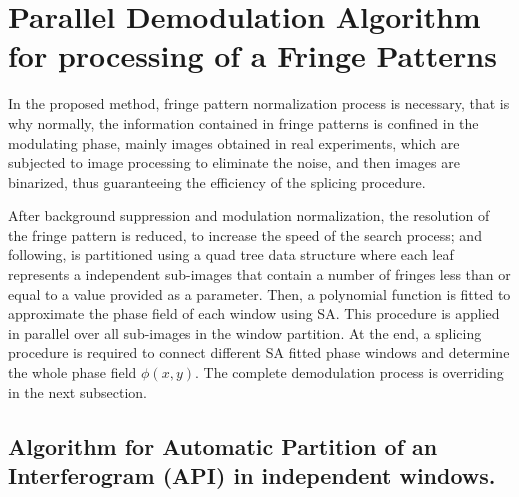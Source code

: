 \documentclass[review]{elsarticle}
\begin{document}
\section{Parallel Demodulation Algorithm for processing of a Fringe Patterns}

In the proposed method, fringe pattern normalization process is necessary, that is why normally, the information contained in fringe patterns is confined in the modulating phase, mainly images obtained in real experiments, which are subjected to image processing to eliminate the noise, and then images are binarized, thus guaranteeing the efficiency of the splicing procedure.

After background suppression and modulation normalization, the resolution of the fringe pattern is reduced, to increase the speed of the search process; and following, is partitioned using a quad tree data structure where each leaf represents a independent sub-images that contain a number of fringes less than or equal to a value provided as a parameter. Then, a polynomial function is fitted to approximate the phase field of each window using SA. This procedure is applied in parallel over all sub-images in the window partition. At the end, a splicing procedure is required to connect different SA fitted phase windows and determine the whole phase field $\phi(x,y)$. The complete demodulation process is overriding in the next subsection.

\subsection{Algorithm for Automatic Partition of an Interferogram (API) in independent windows.}
\end{document}
